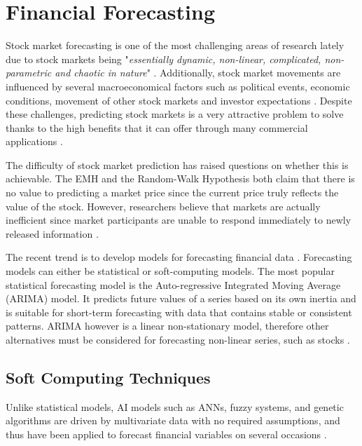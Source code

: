 \documentclass{UoYCSproject}
\begin{document}
\section{Financial Forecasting}
Stock market forecasting is one of the most challenging areas of research lately due to stock markets being "\textit{essentially dynamic, non-linear, complicated, non-parametric and chaotic in nature}" \cite{tan2005brain}. Additionally, stock market movements are influenced by several macroeconomical factors such as political events, economic conditions, movement of other stock markets and investor expectations \cite{zhang2009stock}. Despite these challenges, predicting stock markets is a very attractive problem to solve thanks to the high benefits that it can offer through many commercial applications \cite{majhi2007stock}. 

The difficulty of stock market prediction has raised questions on whether this is achievable. The EMH and the Random-Walk Hypothesis both claim that there is no value to predicting a market price since the current price truly reflects the value of the stock. However, researchers believe that markets are actually inefficient since market participants are unable to respond immediately to newly released information \cite{jensen1978some}. 

The recent trend is to develop models for forecasting financial data \cite{majhi2007stock}. Forecasting models can either be statistical or soft-computing models. The most popular statistical forecasting model is the Auto-regressive Integrated Moving Average (ARIMA) model. It predicts future values of a series based on its own inertia and is suitable for short-term forecasting with data that contains stable or consistent patterns. ARIMA however is a linear non-stationary model, therefore other alternatives must be considered for forecasting non-linear series, such as stocks \cite{wang1996stock}. 

\subsection{Soft Computing Techniques}
Unlike statistical models, AI models such as ANNs, fuzzy systems, and genetic algorithms are driven by multivariate data with no required assumptions, and thus have been applied to forecast financial variables on several occasions \cite{zhong2017forecasting}. 
\end{document}

